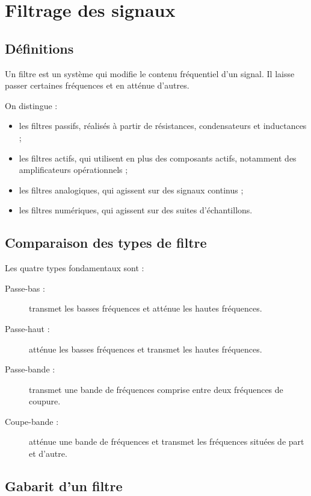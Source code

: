 \section{Filtrage des signaux}\label{sec:elec-filtrage-complet}

\subsection{Définitions}

Un filtre est un système qui modifie le contenu fréquentiel d'un signal. Il laisse passer certaines fréquences et en atténue d'autres.

On distingue :
\begin{itemize}
  \item les filtres passifs, réalisés à partir de résistances, condensateurs et inductances ;
  \item les filtres actifs, qui utilisent en plus des composants actifs, notamment des amplificateurs opérationnels ;
  \item les filtres analogiques, qui agissent sur des signaux continus ;
  \item les filtres numériques, qui agissent sur des suites d'échantillons.
\end{itemize}

\subsection{Comparaison des types de filtre}

Les quatre types fondamentaux sont :
\begin{description}
  \item[Passe-bas :] transmet les basses fréquences et atténue les hautes fréquences.
  \item[Passe-haut :] atténue les basses fréquences et transmet les hautes fréquences.
  \item[Passe-bande :] transmet une bande de fréquences comprise entre deux fréquences de coupure.
  \item[Coupe-bande :] atténue une bande de fréquences et transmet les fréquences situées de part et d'autre.
\end{description}

\subsection{Gabarit d'un filtre}

